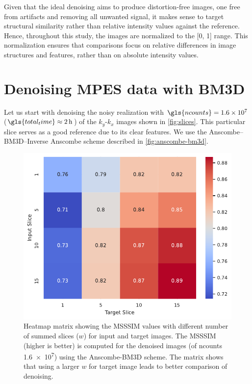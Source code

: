 Given that the ideal denoising aims to produce distortion-free images, one free from artifacts and removing all unwanted signal, it makes sense to target structural similarity rather than relative intensity values against the reference. Hence, throughout this study, the images are normalized to the [\num{0}, \num{1}] range. This normalization ensures that comparisons focus on relative differences in image structures and features, rather than on absolute intensity values.

\section{Denoising MPES data with BM3D}\label{sec:mpes-bm3d-denoise}
Let us start with  denoising the noisy realization with $\gls{ncounts}=\num{1.6e7}$ ($\gls{total_time}\approx\qty{2}{h}$) of the $k_y$-$k_x$ images shown in \cref{fig:slices}. This particular slice serves as a good reference due to its clear features. We use the Anscombe--\gls{BM3D}--Inverse Anscombe scheme described in \cref{fig:anscombe-bm3d}. 


\begin{figure}
    \centering
    \includegraphics[width=0.5\linewidth]{images/confusion_matrix_msssim_window_avg.pdf}
    \caption{Heatmap matrix  showing the \gls{MSSSIM} values with different number of summed slices ($w$) for input and target images. The \gls{MSSSIM} (higher is better) is computed for the denoised images (of \gls{ncounts} \num{1.6e7}) using the Anscombe-BM3D scheme. The matrix shows that using a larger $w$ for target image leads to better comparison of denoising.}
    \label{fig:confusion_matrix_msssim_window_avg}
\end{figure}

